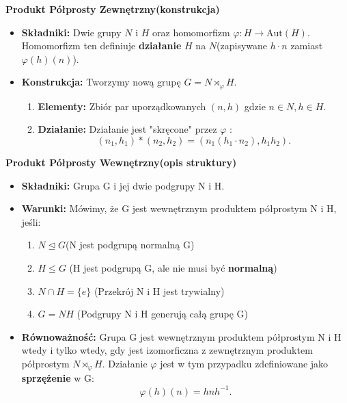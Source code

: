 \begin{enumerate}[label=\arabic*)]
			\textbf{Produkt Półprosty Zewnętrzny(konstrukcja)}
			\begin{itemize}
				\item \textbf{Składniki:} Dwie grupy $N$ i $H$ oraz homomorfizm $\varphi: H\rightarrow \text{Aut}\left( H \right) $. Homomorfizm ten definiuje \textbf{działanie} $H$ na $N$(zapisywane $h\cdot n$ zamiast $\varphi(h)(n)$).
				\item \textbf{Konstrukcja:} Tworzymy nową grupę $G = N\rtimes_{\varphi}H$.
					\begin{enumerate}[label=\alph*)]
						\item \textbf{Elementy:} Zbiór par uporządkowanych $(n,h)$ gdzie  $n\in N, h\in H$.
						\item \textbf{Działanie:} Działanie jest "skręcone" przez $\varphi$ :
							\[
								\left( n_1,h_1 \right) * \left( n_2,h_2 \right) = \left( n_1\left( h_1\cdot n_2 \right) , h_1h_2 \right) 
							.\] 
					\end{enumerate}
			\end{itemize}
			
			\textbf{Produkt Półprosty Wewnętrzny(opis struktury)} 

			\begin{itemize}
				\item \textbf{Składniki:} Grupa G i jej dwie podgrupy N i H.
				\item \textbf{Warunki:} Mówimy, że G jest wewnętrznym produktem półprostym N i H, jeśli:
					\begin{enumerate}[label=\roman*)]
						\item $N\unlhd G$(N jest podgrupą normalną G)
						\item $H\le G$ (H jest podgrupą G, ale nie musi być \textbf{normalną})
						\item $N \cap H = \{ e\} $ (Przekrój N i H jest trywialny)
						\item $G=NH$ (Podgrupy N i H generują całą grupę G)
					\end{enumerate}
				\item \textbf{Równoważność:} Grupa G jest wewnętrznym produktem półprostym N i H wtedy i tylko wtedy, gdy jest izomorficzna z zewnętrznym produktem półprostym $N\rtimes_{\varphi}H$. Działanie $\varphi$ jest w tym przypadku zdefiniowane jako \textbf{sprzężenie}  w G:
					\[
					\varphi\left( h \right) \left( n \right) = hnh^{-1}
					.\] 

\end{itemize}
\end{enumerate}



